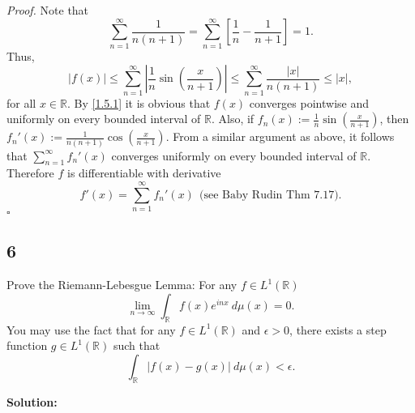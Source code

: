 \documentclass[12pt]{article}
\newcounter{ProofCounter}
\newenvironment{Proof}{\stepcounter{ProofCounter}\textit{Proof.}}{\hfill$\square$}
\begin{document}
\begin{Proof}
Note that 
\[ \sum_{n=1}^{\infty}\frac{1}{n(n+1)} = \sum_{n=1}^{\infty}\left[ \frac{1}{n} - \frac{1}{n+1} \right] = 1. \]
Thus,
\begin{equation}
|f(x)| \leq \sum_{n=1}^{\infty}\left|\frac{1}{n}\sin\left( \frac{x}{n+1} \right)\right| \leq \sum_{n=1}^{\infty}\frac{|x|}{n(n+1)} \leq |x|,
\label{1.5.1}
\end{equation}
for all $x \in \mathbb{R}$. By \eqref{1.5.1} it is obvious that $f(x)$ converges pointwise and uniformly on every bounded interval of $\mathbb{R}$.
Also, if $f_{n}(x) := \frac{1}{n}\sin\left( \frac{x}{n+1} \right)$, then $f_{n}'(x) := \frac{1}{n(n+1)}\cos\left( \frac{x}{n+1} \right)$. From a
similar argument as above, it follows that $\sum_{n=1}^{\infty}f_{n}'(x)$ converges uniformly on every bounded interval of $\mathbb{R}$. Therefore $f$
is differentiable with derivative 
\[ f'(x) = \sum_{n=1}^{\infty}f_{n}'(x) \ \ \text{(see Baby Rudin Thm 7.17)}.\]
\end{Proof}


\newpage 
\subsection*{6}
Prove the Riemann-Lebesgue Lemma: For any $f \in L^{1}(\mathbb{R})$
\[ \lim_{n\rightarrow\infty}\int_{\mathbb{R}}f(x)e^{inx}\ d\mu(x) = 0. \]
You may use the fact that for any $f \in L^{1}(\mathbb{R})$ and $\epsilon > 0$, there exists a step function $g \in L^{1}(\mathbb{R})$ such that 
\[ \int_{\mathbb{R}}|f(x) - g(x)|\ d\mu(x) < \epsilon. \]

{\bf Solution:}
\end{document}
